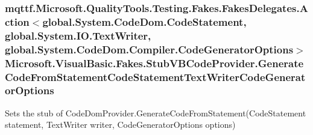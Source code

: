 \hypertarget{class_microsoft_1_1_visual_basic_1_1_fakes_1_1_stub_v_b_code_provider_a4e212efe0aa9d83574f459f0892047ef}{
\subsubsection[{Generate\-Code\-From\-Statement\-Code\-Statement\-Text\-Writer\-Code\-Generator\-Options}]{\setlength{\rightskip}{0pt plus 5cm}mqttf.\-Microsoft.\-Quality\-Tools.\-Testing.\-Fakes.\-Fakes\-Delegates.\-Action$<$global.\-System.\-Code\-Dom.\-Code\-Statement, global.\-System.\-I\-O.\-Text\-Writer, global.\-System.\-Code\-Dom.\-Compiler.\-Code\-Generator\-Options$>$ Microsoft.\-Visual\-Basic.\-Fakes.\-Stub\-V\-B\-Code\-Provider.\-Generate\-Code\-From\-Statement\-Code\-Statement\-Text\-Writer\-Code\-Generator\-Options}}\label{class_microsoft_1_1_visual_basic_1_1_fakes_1_1_stub_v_b_code_provider_a4e212efe0aa9d83574f459f0892047ef}


Sets the stub of Code\-Dom\-Provider.\-Generate\-Code\-From\-Statement(\-Code\-Statement statement, Text\-Writer writer, Code\-Generator\-Options options)

